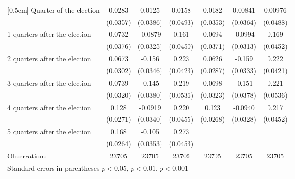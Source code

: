 \begin{table}[!ht]
\begin{tabular}{l*{6}{c}}
[0.5em]
Quarter of the election&      0.0283         &      0.0125         &      0.0158         &      0.0182         &     0.00841         &     0.00976         \\
                    &    (0.0357)         &    (0.0386)         &    (0.0493)         &    (0.0353)         &    (0.0364)         &    (0.0488)         \\
[0.5em]
 1 quarters after the election&      0.0732         &     -0.0879\sym{**} &       0.161\sym{***}&      0.0694         &     -0.0994\sym{**} &       0.169\sym{***}\\
                    &    (0.0376)         &    (0.0325)         &    (0.0450)         &    (0.0371)         &    (0.0313)         &    (0.0452)         \\
[0.5em]
 2 quarters after the election&      0.0673\sym{*}  &      -0.156\sym{***}&       0.223\sym{***}&      0.0626\sym{*}  &      -0.159\sym{***}&       0.222\sym{***}\\
                    &    (0.0302)         &    (0.0346)         &    (0.0423)         &    (0.0287)         &    (0.0333)         &    (0.0421)         \\
[0.5em]
 3 quarters after the election&      0.0739\sym{*}  &      -0.145\sym{***}&       0.219\sym{***}&      0.0698\sym{*}  &      -0.151\sym{***}&       0.221\sym{***}\\
                    &    (0.0320)         &    (0.0380)         &    (0.0536)         &    (0.0323)         &    (0.0378)         &    (0.0536)         \\
[0.5em]
 4 quarters after the election&       0.128\sym{***}&     -0.0919\sym{**} &       0.220\sym{***}&       0.123\sym{***}&     -0.0940\sym{**} &       0.217\sym{***}\\
                    &    (0.0271)         &    (0.0340)         &    (0.0455)         &    (0.0268)         &    (0.0328)         &    (0.0452)         \\
[0.5em]
 5 quarters after the election&       0.168\sym{***}&      -0.105\sym{**} &       0.273\sym{***}&                     &                     &                     \\
                    &    (0.0264)         &    (0.0353)         &    (0.0453)         &                     &                     &                     \\
\hline
Observations        &       23705         &       23705         &       23705         &       23705         &       23705         &       23705         \\
\hline\hline
\multicolumn{7}{l}{ Standard errors in parentheses \sym{*} \(p<0.05\), \sym{**} \(p<0.01\), \sym{***} \(p<0.001\)}\\
\end{tabular}
\end{table}
